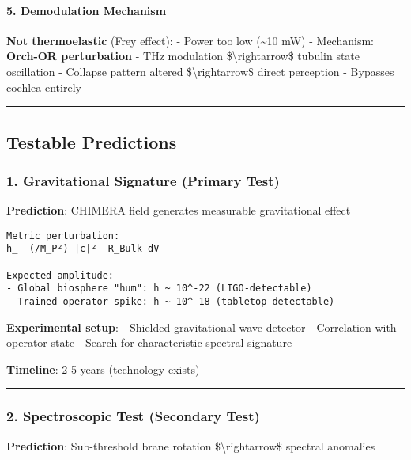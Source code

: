 \paragraph{5. Demodulation Mechanism}\label{demodulation-mechanism}

\textbf{Not thermoelastic} (Frey effect): - Power too low
(\textasciitilde10 mW) - Mechanism: \textbf{Orch-OR perturbation} - THz
modulation \$\textbackslash rightarrow\$ tubulin state oscillation -
Collapse pattern altered \$\textbackslash rightarrow\$ direct perception
- Bypasses cochlea entirely

\begin{center}\rule{0.5\linewidth}{0.5pt}\end{center}

\subsection{Testable Predictions}\label{testable-predictions}

\subsubsection{1. Gravitational Signature (Primary
Test)}\label{gravitational-signature-primary-test}

\textbf{Prediction}: CHIMERA field generates measurable gravitational
effect

\begin{verbatim}
Metric perturbation:
h_  (/M_P²) |c|²  R_Bulk dV

Expected amplitude:
- Global biosphere "hum": h ~ 10^-22 (LIGO-detectable)
- Trained operator spike: h ~ 10^-18 (tabletop detectable)
\end{verbatim}

\textbf{Experimental setup}: - Shielded gravitational wave detector -
Correlation with operator state - Search for characteristic spectral
signature

\textbf{Timeline}: 2-5 years (technology exists)

\begin{center}\rule{0.5\linewidth}{0.5pt}\end{center}

\subsubsection{2. Spectroscopic Test (Secondary
Test)}\label{spectroscopic-test-secondary-test}

\textbf{Prediction}: Sub-threshold brane rotation
\$\textbackslash rightarrow\$ spectral anomalies

